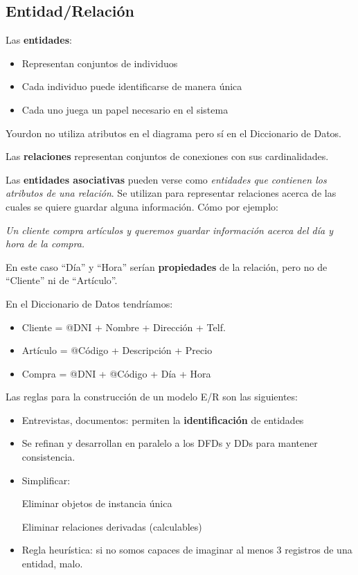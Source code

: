 \subsection{Entidad/Relación}

Las \textbf{entidades}:

\begin{itemize}[noitemsep]
\item Representan conjuntos de individuos
\item Cada individuo puede identificarse de manera única
\item Cada uno juega un papel necesario en el sistema
\end{itemize}

Yourdon no utiliza atributos en el diagrama pero sí en el Diccionario de Datos.

Las \textbf{relaciones} representan conjuntos de conexiones con sus cardinalidades.

Las \textbf{entidades asociativas} pueden verse como \textit{entidades que contienen los atributos de una relación}. Se utilizan para representar relaciones acerca de las cuales se quiere guardar alguna información. Cómo por ejemplo:

\textit{Un cliente compra artículos y queremos guardar información acerca del día y hora de la compra.}

En este caso ``Día'' y ``Hora'' serían \textbf{propiedades} de la relación, pero no de ``Cliente'' ni de ``Artículo''.

En el Diccionario de Datos tendríamos:

\begin{itemize}[noitemsep]
\item Cliente = @DNI + Nombre + Dirección + Telf.
\item Artículo = @Código + Descripción + Precio
\item Compra = @DNI + @Código + Día + Hora
\end{itemize}

Las reglas para la construcción de un modelo E/R son las siguientes:

\begin{itemize}[noitemsep]
\item Entrevistas, documentos: permiten la \textbf{identificación} de entidades
\item Se refinan y desarrollan en paralelo a los DFDs y DDs para mantener consistencia.
\item Simplificar:

  Eliminar objetos de instancia única

  Eliminar relaciones derivadas (calculables)

\item Regla heurística: si no somos capaces de imaginar al menos 3 registros de una entidad, malo.
\end{itemize}

